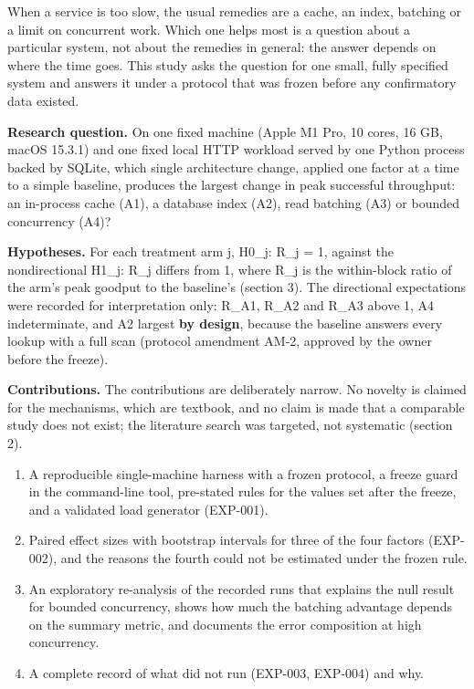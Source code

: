 \documentclass[
]{article}
\providecommand{\tightlist}{%
  \setlength{\itemsep}{0pt}\setlength{\parskip}{0pt}}
\begin{document}
When a service is too slow, the usual remedies are a cache, an index,
batching or a limit on concurrent work. Which one helps most is a
question about a particular system, not about the remedies in general:
the answer depends on where the time goes. This study asks the question
for one small, fully specified system and answers it under a protocol
that was frozen before any confirmatory data existed.

\textbf{Research question.} On one fixed machine (Apple M1 Pro, 10
cores, 16 GB, macOS 15.3.1) and one fixed local HTTP workload served by
one Python process backed by SQLite, which single architecture change,
applied one factor at a time to a simple baseline, produces the largest
change in peak successful throughput: an in-process cache (A1), a
database index (A2), read batching (A3) or bounded concurrency (A4)?

\textbf{Hypotheses.} For each treatment arm j, H0\_j: R\_j = 1, against
the nondirectional H1\_j: R\_j differs from 1, where R\_j is the
within-block ratio of the arm's peak goodput to the baseline's (section
3). The directional expectations were recorded for interpretation only:
R\_A1, R\_A2 and R\_A3 above 1, A4 indeterminate, and A2 largest
\textbf{by design}, because the baseline answers every lookup with a
full scan (protocol amendment AM-2, approved by the owner before the
freeze).

\textbf{Contributions.} The contributions are deliberately narrow. No
novelty is claimed for the mechanisms, which are textbook, and no claim
is made that a comparable study does not exist; the literature search
was targeted, not systematic (section 2).

\begin{enumerate}
\def\labelenumi{\arabic{enumi}.}
\tightlist
\item
  A reproducible single-machine harness with a frozen protocol, a freeze
  guard in the command-line tool, pre-stated rules for the values set
  after the freeze, and a validated load generator (EXP-001).
\item
  Paired effect sizes with bootstrap intervals for three of the four
  factors (EXP-002), and the reasons the fourth could not be estimated
  under the frozen rule.
\item
  An exploratory re-analysis of the recorded runs that explains the null
  result for bounded concurrency, shows how much the batching advantage
  depends on the summary metric, and documents the error composition at
  high concurrency.
\item
  A complete record of what did not run (EXP-003, EXP-004) and why.
\end{enumerate}
\end{document}
